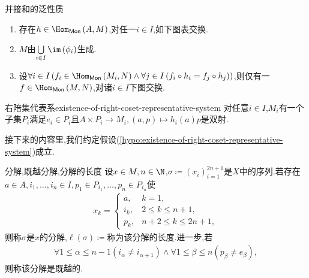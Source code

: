 \begin{proposition}{并接和的泛性质}{}
	\begin{enumerate}
		\item 存在$h\in\Hom_{\mathsf{Mon}}\left(A,M\right)$,对任一$i\in I$,如下图表交换.
		\begin{center}
		\end{center}
		\item $M$由$\bigcup\limits_{i\in I}\im\left(\phi_{i}\right)$生成.
		\item 设$\forall i\in I\left(f_{i}\in\Hom_{\mathsf{Mon}}\left(M_{i},N\right)\wedge\forall j\in I\left(f_{i}\circ h_{i}=f_{j}\circ h_{j}\right)\right)$,则仅有一$f\in\Hom_{\mathsf{Mon}}\left(M,N\right)$,对诸$i\in I$下图交换.
		\begin{center}
		\end{center}
	\end{enumerate}
\end{proposition}

\begin{hypothesis}{右陪集代表系}{existence-of-right-coset-representative-system}
	对任意$i\in I$,$M_{i}$有一个子集$P_{i}$满足$e_{i}\in P_{i}$且$A\times P_{i}\to M_{i},\left(a,p\right)\mapsto h_{i}\left(a\right)p$是双射.
\end{hypothesis}

接下来的内容里,我们约定假设(\ref{hypo:existence-of-right-coset-representative-system})成立.

\begin{definition}{分解,既越分解,分解的长度}{}
	设$x\in M,n\in\N$,$\sigma\coloneq\left(x_{i}\right)_{i=1}^{2n+1}$是$X$中的序列.若存在$a\in A,i_{1},\ldots,i_{n}\in I,p_{1}\in P_{i_{1}},\ldots,p_{n}\in P_{i_{n}}$使
	\begin{align}
		x_{k}=
		\begin{cases}
			a,&k=1,\\
			i_{k},&2\leq k\leq n+1,\\
			p_{k},&n+2\leq k\leq 2n+1,
		\end{cases}
	\end{align}
	则称$\sigma$是$x$的分解,$\ell\left(\sigma\right)\coloneq$称为该分解的长度.进一步,若
	\begin{align*}
		\forall 1\leq\alpha\leq n-1\left(i_{\alpha}\neq i_{\alpha+1}\right)\wedge\forall 1\leq\beta\leq n\left(p_{\beta}\neq e_{\beta}\right),
	\end{align*}
	则称该分解是既越的.
\end{definition}

